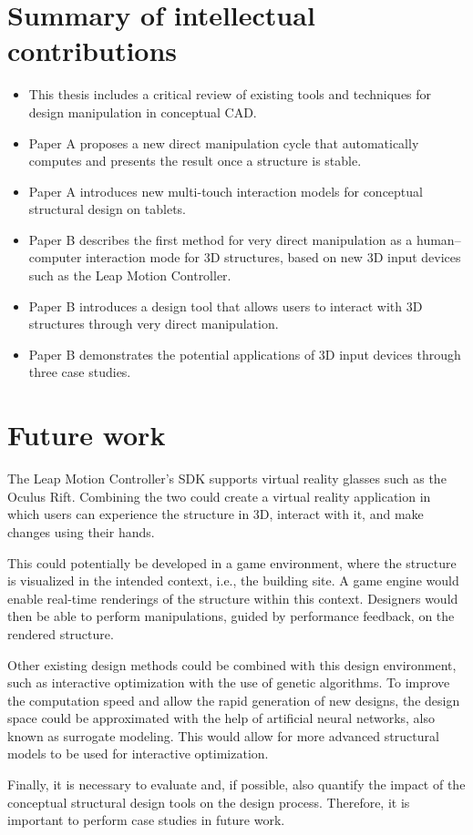 \section{Summary of intellectual contributions}
\begin{itemize} 
\item This thesis includes a critical review of existing tools and techniques for design manipulation in conceptual CAD.
\item Paper A proposes a new direct manipulation cycle that automatically computes and presents the result once a structure is stable.
\item Paper A introduces new multi-touch interaction models for conceptual structural design on tablets.
\item Paper B describes the first method for very direct manipulation as a human--computer interaction mode for 3D structures, based on new 3D input devices such as the Leap Motion Controller.
\item Paper B introduces a design tool that allows users to interact with 3D structures through very direct manipulation.
\item Paper B demonstrates the potential applications of 3D input devices through three case studies.
\end{itemize} 


\section{Future work}
The Leap Motion Controller’s SDK supports virtual reality glasses such as the Oculus Rift. Combining the two could create a virtual reality application in which users can experience the structure in 3D, interact with it, and make changes using their hands. 

This could potentially be developed in a game environment, where the structure is visualized in the intended context, i.e., the building site. A game engine would enable real-time renderings of the structure within this context. Designers would then be able to perform manipulations, guided by performance feedback, on the rendered structure. 

Other existing design methods could be combined with this design environment, such as interactive optimization with the use of genetic algorithms. To improve the computation speed and allow the rapid generation of new designs, the design space could be approximated with the help of artificial neural networks, also known as surrogate modeling. This would allow for more advanced structural models to be used for interactive optimization.

Finally, it is necessary to evaluate and, if possible, also quantify the impact of the conceptual structural design tools on the design process. Therefore, it is important to perform case studies in future work.

